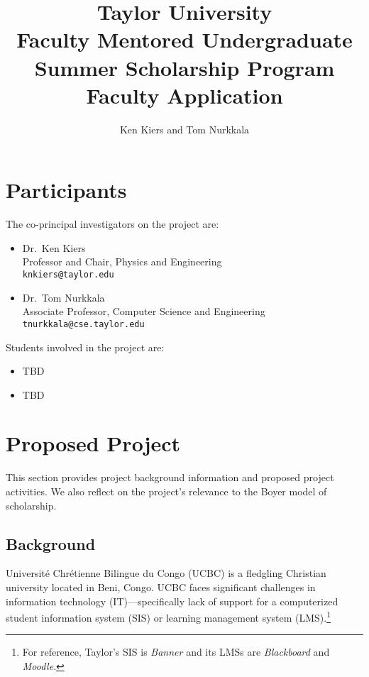 \documentclass{article}
\title{Taylor University\\
  Faculty Mentored Undergraduate\\
  Summer Scholarship Program\\
  Faculty Application}
\author{Ken Kiers and Tom Nurkkala}
\begin{document}
\maketitle
\tableofcontents
\newpage

\section{Participants}
\label{sec:participants}

The co-principal investigators on the project are:
\begin{itemize}
\item Dr.\ Ken Kiers\\
  Professor and Chair, Physics and Engineering\\
  \texttt{knkiers@taylor.edu}
\item Dr.\ Tom Nurkkala\\
  Associate Professor, Computer Science and Engineering\\
  \texttt{tnurkkala@cse.taylor.edu}
\end{itemize}

Students involved in the project are:
  \begin{itemize}
  \item TBD
  \item TBD
  \end{itemize}


\section{Proposed Project}
\label{sec:proposed-project}


This section provides project background information
and proposed project activities.
We also reflect on the project's relevance
to the Boyer model of scholarship.

\subsection{Background}
\label{sec:background}

Universit\'e Chr\'etienne Bilingue du Congo (UCBC)
is a fledgling Christian university located in Beni, Congo.
UCBC faces significant challenges in information technology (IT)---specifically
lack of support for a computerized
student information system (SIS) or
learning management system (LMS).\footnote{For reference,
  Taylor's SIS is \emph{Banner}
  and its LMSs are \emph{Blackboard} and \emph{Moodle}.}
\end{document}
